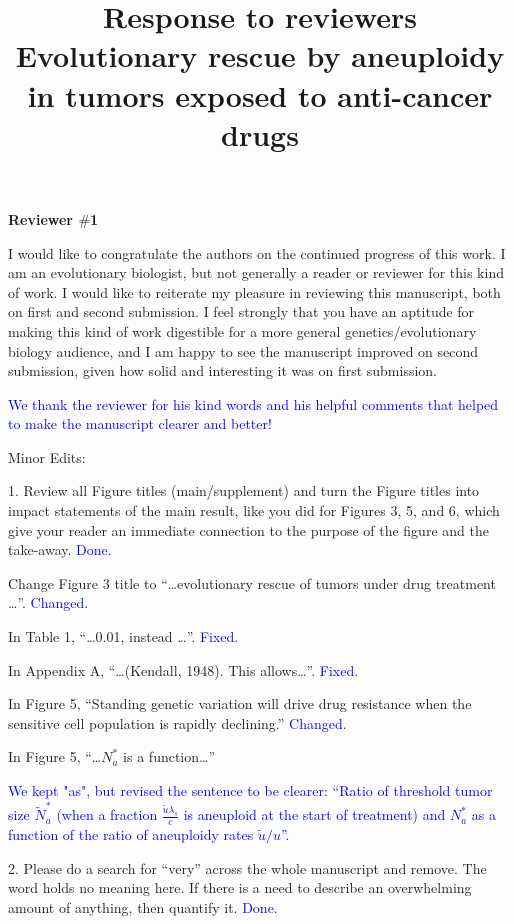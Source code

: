 \documentclass[12pt]{extarticle}
\title{
	Response to reviewers Evolutionary rescue by aneuploidy in tumors exposed to anti-cancer drugs 
}
\begin{document}
\maketitle

\textbf{Reviewer $\#$1}

I would like to congratulate the authors on the continued progress of this work. I am an evolutionary biologist, but not generally a reader or reviewer for this kind of work. I would like to reiterate my pleasure in reviewing this manuscript, both on first and second submission. I feel strongly that you have an aptitude for making this kind of work digestible for a more general genetics/evolutionary biology audience, and I am happy to see the manuscript improved on second submission, given how solid and interesting it was on first submission.

\textcolor{blue}{We thank the reviewer for his kind words and his helpful comments that helped to make the manuscript clearer and better!}

Minor Edits:

1. Review all Figure titles (main/supplement) and turn the Figure titles into impact statements of the main result, like you did for Figures 3, 5, and 6, which give your reader an immediate connection to the purpose of the figure and the take-away. 
\textcolor{blue}{Done.}

Change Figure 3 title to ``\ldots evolutionary rescue of tumors under drug treatment \ldots''. 
\textcolor{blue}{Changed.}

In Table 1, ``\ldots 0.01, instead \dots''. 
\textcolor{blue}{Fixed.}

In Appendix A, ``\ldots (Kendall, 1948). This allows\ldots''. 
\textcolor{blue}{Fixed.}

In Figure 5, ``Standing genetic variation will drive drug resistance when the sensitive cell population is rapidly declining.'' 
\textcolor{blue}{Changed.}

In Figure 5, ``\ldots $N_a^*$ is a function\ldots''

\textcolor{blue}{We kept "as", but revised the sentence to be clearer: ``Ratio of threshold tumor size $\tilde{N}_a^*$ (when a fraction $\frac{\tilde{u}\lambda_s}{c}$ is aneuploid at the start of treatment) and $N_a^*$ as a function of the ratio of aneuploidy rates $\tilde{u}/u$''.}


2. Please do a search for ``very'' across the whole manuscript and remove. The word holds no meaning here. If there is a need to describe an overwhelming amount of anything, then quantify it. 
\textcolor{blue}{Done.}
\end{document}
